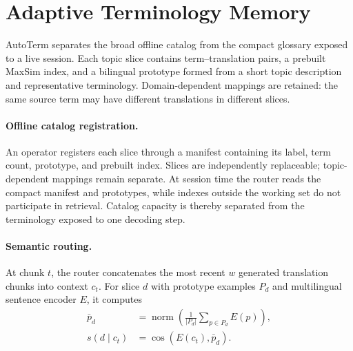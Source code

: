 \section{Adaptive Terminology Memory}
\label{sec:adaptive-memory}

AutoTerm separates the broad offline catalog from the compact glossary exposed
to a live session. Each topic slice contains term--translation pairs, a
prebuilt MaxSim index, and a bilingual prototype formed from a short topic
description and representative terminology. Domain-dependent mappings are
retained: the same source term may have different translations in different
slices.

\paragraph{Offline catalog registration.}
An operator registers each slice through a manifest containing its label, term
count, prototype, and prebuilt index. Slices are independently replaceable;
topic-dependent mappings remain separate. At session time the router reads the
compact manifest and prototypes, while indexes outside the working set do not
participate in retrieval. Catalog capacity is thereby separated from the
terminology exposed to one decoding step.

\paragraph{Semantic routing.}
At chunk $t$, the router concatenates the most recent $w$ generated
translation chunks into context $c_t$. For slice $d$ with prototype examples
$P_d$ and multilingual sentence encoder $E$, it computes
\begin{equation}
\begin{aligned}
  \bar p_d &=
  \operatorname{norm}\!\left(\frac{1}{|P_d|}
  \sum_{p\in P_d} E(p)\right), \\
  s(d\mid c_t) &= \cos\!\left(E(c_t),\bar p_d\right).
\end{aligned}
\end{equation}

